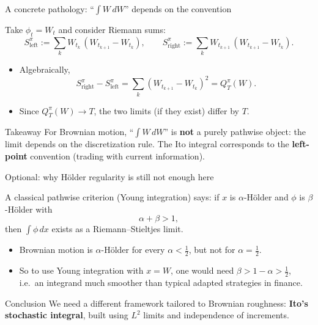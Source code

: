 \documentclass[10pt,aspectratio=169]{beamer}
\begin{document}
\begin{frame}{A concrete pathology: ``$\int W\,dW$'' depends on the convention}

Take $\phi_t=W_t$ and consider Riemann sums:
\[
S^\pi_{\mathrm{left}}
:=\sum_{k} W_{t_k}\,(W_{t_{k+1}}-W_{t_k}),
\qquad
S^\pi_{\mathrm{right}}
:=\sum_{k} W_{t_{k+1}}\,(W_{t_{k+1}}-W_{t_k}).
\]
\pause

\begin{itemize}
  \item Algebraically,
  \[
  S^\pi_{\mathrm{right}}-S^\pi_{\mathrm{left}}
  =\sum_k (W_{t_{k+1}}-W_{t_k})^2
  =Q^\pi_T(W).
  \]
  \pause
  \item Since $Q^\pi_T(W)\to T$, the two limits (if they exist) differ by $T$.
\end{itemize}
\pause

\begin{block}{Takeaway}
For Brownian motion, ``$\int W\,dW$'' is \textbf{not} a purely pathwise object:
the limit depends on the discretization rule.
The Ito integral corresponds to the \textbf{left-point} convention
(trading with current information).
\end{block}

\end{frame}

\begin{frame}{Optional: why Hölder regularity is still not enough here}

A classical pathwise criterion (Young integration) says:
if $x$ is $\alpha$-H\"older and $\phi$ is $\beta$-H\"older with
\[
\alpha+\beta>1,
\]
then $\int \phi\,dx$ exists as a Riemann--Stieltjes limit.
\pause

\begin{itemize}
  \item Brownian motion is $\alpha$-H\"older for every $\alpha<\tfrac12$,
  but not for $\alpha=\tfrac12$.
  \item So to use Young integration with $x=W$, one would need $\beta>1-\alpha>\tfrac12$,
  i.e.\ an integrand much smoother than typical adapted strategies in finance.
\end{itemize}
\pause

\begin{alertblock}{Conclusion}
We need a different framework tailored to Brownian roughness:
\textbf{Ito's stochastic integral}, built using $L^2$ limits and independence of increments.
\end{alertblock}

\end{frame}
\end{document}
